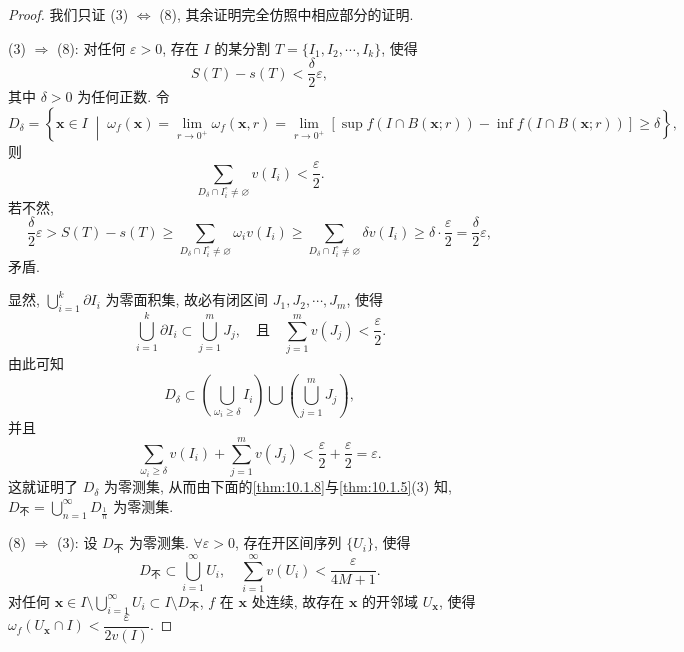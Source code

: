 \begin{proof}
我们只证 (3) $\Leftrightarrow$ (8), 其余证明完全仿照中相应部分的证明.

(3) $\Rightarrow$ (8): 对任何 $\varepsilon > 0$, 存在 $I$ 的某分割 $T = \{I_{1}, I_{2}, \cdots, I_{k}\}$, 使得
\[
  S(T) - s(T) < \frac{\delta}{2} \varepsilon,
\]
其中 $\delta > 0$ 为任何正数. 令
\[
  D_{\delta} = \left\{\boldsymbol{x} \in I \;\middle|\; \omega_{f}(\boldsymbol{x}) = \lim_{r \to 0^{+}} \omega_{f}(\boldsymbol{x}, r) = \lim_{r \to 0^{+}} [\sup f(I \cap B(\boldsymbol{x}; r)) - \inf f(I \cap B(\boldsymbol{x}; r))] \geqslant \delta\right\},
\]
则
\[
  \sum_{D_{\delta} \cap I_{i}^{\circ} \neq \varnothing} v(I_{i}) < \frac{\varepsilon}{2}.
\]
若不然,
\[
  \frac{\delta}{2}\varepsilon > S(T) - s(T) \geqslant \sum_{D_{\delta} \cap I_{i}^{\circ} \neq \varnothing} \omega_{i} v(I_{i}) \geqslant \sum_{D_{\delta} \cap I_{i}^{\circ} \neq \varnothing} \delta v(I_{i}) \geqslant \delta \cdot \frac{\varepsilon}{2} = \frac{\delta}{2}\varepsilon,
\]
矛盾.

显然, $\bigcup\limits_{i=1}^{k} \partial I_{i}$ 为零面积集, 故必有闭区间 $J_{1}, J_{2}, \cdots, J_{m}$, 使得
\[
  \bigcup_{i=1}^{k} \partial I_{i} \subset \bigcup_{j=1}^{m} J_{j}, \quad\text{且}\quad \sum_{j=1}^{m} v(J_{j}) < \frac{\varepsilon}{2}.
\]
由此可知
\[
  D_{\delta} \subset \left(\bigcup_{\omega_{i} \geqslant \delta} I_{i}\right) \bigcup \left(\bigcup_{j=1}^{m} J_{j}\right),
\]
并且
\[
  \sum_{\omega_{i} \geqslant \delta} v(I_{i}) + \sum_{j=1}^{m} v(J_{j}) < \frac{\varepsilon}{2} + \frac{\varepsilon}{2} = \varepsilon.
\]
这就证明了 $D_{\delta}$ 为零测集, 从而由下面的\cref{thm:10.1.8}与\cref{thm:10.1.5}(3) 知, $D_{\text{不}} = \bigcup\limits_{n=1}^{\infty} D_{\frac{1}{n}}$ 为零测集.

(8) $\Rightarrow$ (3): 设 $D_{\text{不}}$ 为零测集. $\forall \varepsilon > 0$, 存在开区间序列 $\{U_{i}\}$, 使得
\[
  D_{\text{不}} \subset \bigcup_{i=1}^{\infty} U_{i}, \quad \sum_{i=1}^{\infty} v(U_{i}) < \frac{\varepsilon}{4M + 1}.
\]
对任何 $\boldsymbol{x} \in I \setminus \bigcup\limits_{i=1}^{\infty} U_{i} \subset I \setminus D_{\text{不}}$, $f$ 在 $\boldsymbol{x}$ 处连续, 故存在 $\boldsymbol{x}$ 的开邻域 $U_{\boldsymbol{x}}$, 使得 $\omega_{f}(U_{\boldsymbol{x}} \cap I) < \dfrac{\varepsilon}{2 v(I)}$.


\end{proof}
